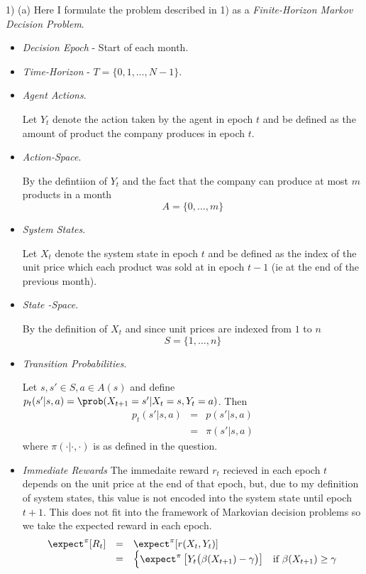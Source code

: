 \documentclass[11pt,a4paper]{article}
\begin{document}
\begin{answer}{1) (a)}
  Here I formulate the problem described in 1) as a \textit{Finite-Horizon Markov Decision Problem}.
  \begin{itemize}
    \item \textit{Decision Epoch} - Start of each month.
    \item \textit{Time-Horizon} - $T=\{0,1,\dots,N-1\}$.
    \item \textit{Agent Actions}.
    \par Let $Y_t$ denote the action taken by the agent in epoch $t$ and be defined as the amount of product the company produces in epoch $t$.
    \item \textit{Action-Space}.
    \par By the defintiion of $Y_t$ and the fact that the company can produce at most $m$ products in a month
    \[ A=\{0,\dots,m\} \]
    \item \textit{System States}.
    \par Let $X_t$ denote the system state in epoch $t$ and be defined as the index of the unit price which each product was sold at in epoch $t-1$ (ie at the end of the previous month).
    \item \textit{State -Space}.
    \par By the definition of $X_t$ and since unit prices are indexed from $1$ to $n$
    \[ S=\{1,\dots,n\} \]
    \item \textit{Transition Probabilities}.
    \par Let $s,s'\in S,a\in A(s)$ and define $p_t(s'|s,a)=\prob(X_{t+1}=s'|X_t=s,Y_t=a)$. Then
    \[\begin{array}{rcl}
      p_t(s'|s,a)&=&p(s'|s,a)\\
      &=&\pi(s'|s,a)
    \end{array}\]
    where $\pi(\cdot|\cdot,\cdot)$ is as defined in the question.
    \item \textit{Immediate Rewards}
    The immedaite reward $r_t$ recieved in each epoch $t$ depends on the unit price at the end of that epoch, but, due to my definition of system states, this value is not encoded into the system state until epoch $t+1$. This does not fit into the framework of Markovian decision problems so we take the expected reward in each epoch.
    \[\begin{array}{rcl}
      \expect^\pi[R_t]&=&\expect^\pi[r(X_t,Y_t)]\\
      &=&\begin{cases}
        \expect^\pi\left[Y_t\big(\beta(X_{t+1})-\gamma\big)\right]&\text{if }\beta(X_{t+1})\geq\gamma\\

\end{cases}
\end{array}\]
\end{itemize}
\end{answer}
\end{document}
